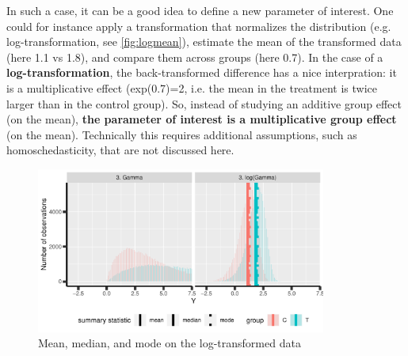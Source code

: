 \documentclass[12pt]{article}
\begin{document}
\clearpage

 In such a case, it can be a good idea to define a new parameter of
interest. One could for instance apply a transformation that
normalizes the distribution (e.g. log-transformation, see
\autoref{fig:logmean}), estimate the mean of the transformed data (here
1.1 vs 1.8), and compare them across groups (here 0.7). In the case of
a \textbf{log-transformation}, the back-transformed difference has a nice
interpration: it is a multiplicative effect (exp(0.7)=2, i.e. the mean
in the treatment is twice larger than in the control group). So,
instead of studying an additive group effect (on the mean), \textbf{the
parameter of interest is a multiplicative group effect} (on the
mean). Technically this requires additional assumptions, such as
homoschedasticity, that are not discussed here.


\begin{figure}[!h]
\centering
\includegraphics[width=0.85\textwidth]{./figures/logmean.pdf}
\caption{\label{fig:logmean}Mean, median, and mode on the log-transformed data}
\end{figure}
\end{document}
